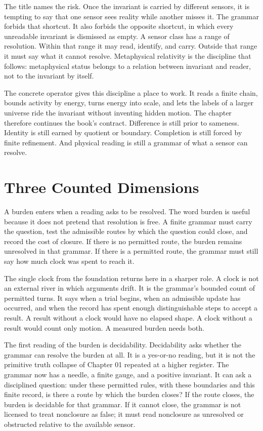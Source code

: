 The title names the risk. Once the invariant is carried by different
sensors, it is tempting to say that one sensor sees reality while another
misses it. The grammar forbids that shortcut. It also forbids the opposite
shortcut, in which every unreadable invariant is dismissed as empty. A
sensor class has a range of resolution. Within that range it may read,
identify, and carry. Outside that range it must say what it cannot resolve.
Metaphysical relativity is the discipline that follows: metaphysical status
belongs to a relation between invariant and reader, not to the invariant by
itself.

The concrete operator gives this discipline a place to work. It reads a
finite chain, bounds activity by energy, turns energy into scale, and lets
the labels of a larger universe ride the invariant without inventing hidden
motion. The chapter therefore continues the book's contract. Difference is
still prior to sameness. Identity is still earned by quotient or boundary.
Completion is still forced by finite refinement. And physical reading is
still a grammar of what a sensor can resolve.

\section{Three Counted Dimensions}

A burden enters when a reading asks to be resolved. The word burden is useful
because it does not pretend that resolution is free. A finite grammar must
carry the question, test the admissible routes by which the question could
close, and record the cost of closure. If there is no permitted route, the
burden remains unresolved in that grammar. If there is a permitted route,
the grammar must still say how much clock was spent to reach it.

The single clock from the foundation returns here in a sharper role. A clock
is not an external river in which arguments drift. It is the grammar's
bounded count of permitted turns. It says when a trial begins, when an
admissible update has occurred, and when the record has spent enough
distinguishable steps to accept a result. A result without a clock would
have no elapsed shape. A clock without a result would count only motion. A
measured burden needs both.

The first reading of the burden is decidability. Decidability asks whether
the grammar can resolve the burden at all. It is a yes-or-no reading, but it
is not the primitive truth collapse of Chapter 01 repeated at a higher
register. The grammar now has a needle, a finite gauge, and a positive
invariant. It can ask a disciplined question: under these permitted rules,
with these boundaries and this finite record, is there a route by which the
burden closes? If the route closes, the burden is decidable for that
grammar. If it cannot close, the grammar is not licensed to treat nonclosure
as false; it must read nonclosure as unresolved or obstructed relative to the
available sensor.

